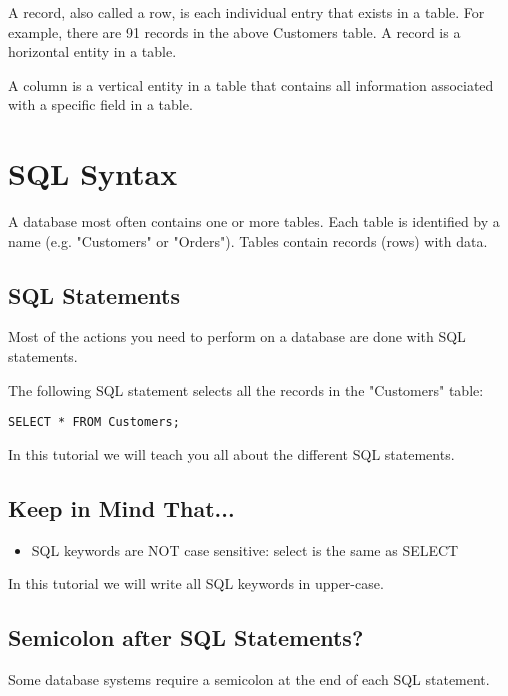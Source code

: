 \documentclass[a4paper,12pt]{article}
\begin{document}
A record, also called a row, is each individual entry that exists in a table. For example, there are 91 records in the above Customers table. A record is a horizontal entity in a table.

A column is a vertical entity in a table that contains all information associated with a specific field in a table.



\section{SQL Syntax}

A database most often contains one or more tables. Each table is identified by a name (e.g. "Customers" or "Orders"). Tables contain records (rows) with data.

\subsection{SQL Statements}

Most of the actions you need to perform on a database are done with SQL statements.

The following SQL statement selects all the records in the "Customers" table:


\begin{lstlisting}
SELECT * FROM Customers;
\end{lstlisting}

In this tutorial we will teach you all about the different SQL statements.


\subsection{Keep in Mind That...}

\begin{itemize}
	\item SQL keywords are NOT case sensitive: select is the same as SELECT
\end{itemize}

In this tutorial we will write all SQL keywords in upper-case.



\subsection{Semicolon after SQL Statements?}

Some database systems require a semicolon at the end of each SQL statement.
\end{document}
